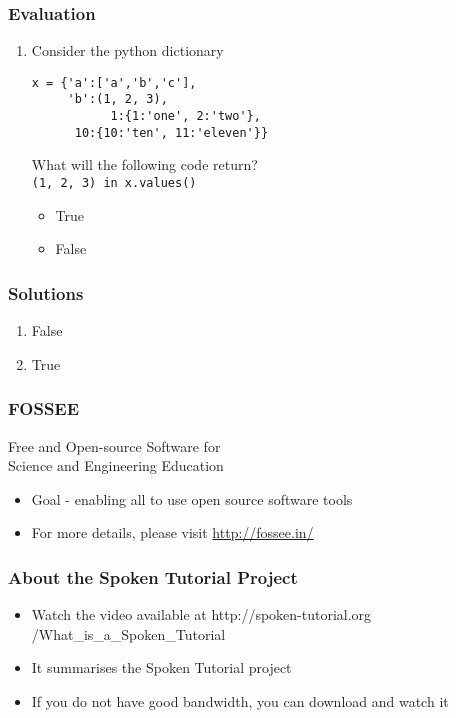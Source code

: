\documentclass[17pt,compress]{beamer}
\newcounter{saveenumi}
\newcommand{\conti}{\setcounter{enumi}{\value{saveenumi}}}
\begin{document}
\begin{frame}[fragile]
\frametitle{Evaluation}
\label{sec-9.2}

\begin{enumerate}
\conti
\item Consider the python dictionary 
\lstset{language=Python}
\begin{small}
\begin{lstlisting}
x = {'a':['a','b','c'], 
     'b':(1, 2, 3),
	       1:{1:'one', 2:'two'},
      10:{10:'ten', 11:'eleven'}}
\end{lstlisting}
\end{small}\pause
What will the following code return?\\ 
\texttt{(1, 2, 3) in x.values()}
\vspace{3pt}     
	\begin{itemize}
	\item True
	\item False
	\end{itemize}
\end{enumerate}
\end{frame}
\begin{frame}
\frametitle{Solutions}
\label{sec-10}

\begin{enumerate}
\item False\pause
\vspace{15pt}
\item True
\end{enumerate}
\end{frame}
\begin{frame}
\frametitle{FOSSEE}
{\color{blue}Free and Open-source Software for \\Science and Engineering Education} \\
\begin{itemize}
\item Goal - enabling all to use open source software tools
\item For more details, please visit {\color{blue}\url{http://fossee.in/}}
\end{itemize}
\end{frame}
\begin{frame}
\frametitle{About the Spoken Tutorial Project}
\begin{itemize}
\item Watch the video available at {\color{blue}http://spoken-tutorial.org /What\_is\_a\_Spoken\_Tutorial}
\item It summarises the Spoken Tutorial project \pause
\item If you do not have good bandwidth, you can download and watch it
\end{itemize}
\end{frame}
\end{document}
